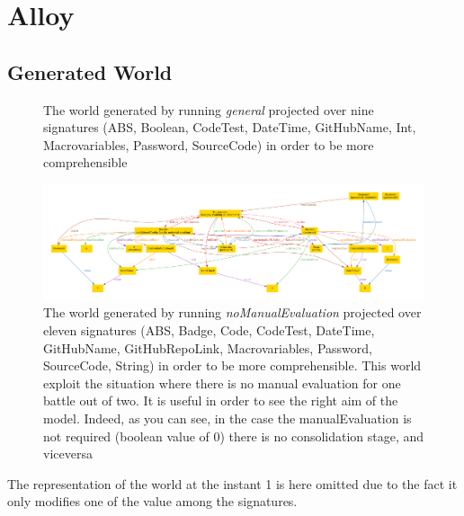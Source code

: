 \section{Alloy}
\lstset{
  language=alloy,
  basicstyle=\small\ttfamily,
  breaklines=true,
  showstringspaces=false
}


\subsection{Generated World}
\begin{figure}[h]
  \centering
  \caption{The world generated by running \textit{general} projected over nine signatures (ABS, Boolean, CodeTest, DateTime, GitHubName, Int, Macrovariables, Password, SourceCode) in order to be more comprehensible}
\end{figure}

\begin{figure}[h]
  \centering
  \includegraphics[width=1\linewidth]{RASD/4Alloy/res/noManualEvaluation.pdf}
  \caption{The world generated by running \textit{noManualEvaluation} projected over eleven signatures (ABS, Badge, Code, CodeTest, DateTime, GitHubName, GitHubRepoLink, Macrovariables, Password, SourceCode, String) in order to be more comprehensible. This world exploit the situation where there is no manual evaluation for one battle out of two. It is useful in order to see the right aim of the model. Indeed, as you can see, in the case the manualEvaluation is not required (boolean value of 0) there is no consolidation stage, and viceversa}
\end{figure}

The representation of the world at the instant 1 is here omitted due to the fact it only modifies one of the value among the signatures.